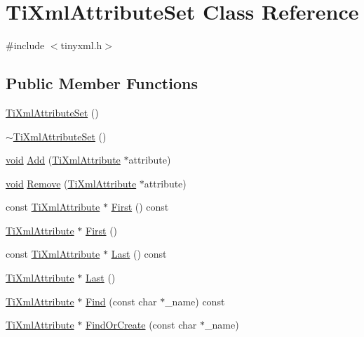 \hypertarget{class_ti_xml_attribute_set}{\section{Ti\-Xml\-Attribute\-Set Class Reference}
\label{class_ti_xml_attribute_set}
}


{\ttfamily \#include $<$tinyxml.\-h$>$}

\subsection*{Public Member Functions}
\begin{DoxyCompactItemize}
\item 
\hyperlink{class_ti_xml_attribute_set_a253c33b657cc85a07f7f060b02146c35}{Ti\-Xml\-Attribute\-Set} ()
\item 
\hyperlink{class_ti_xml_attribute_set_add463905dff96142a29fe16a01ecf28f}{$\sim$\-Ti\-Xml\-Attribute\-Set} ()
\item 
\hyperlink{wglew_8h_aeea6e3dfae3acf232096f57d2d57f084}{void} \hyperlink{class_ti_xml_attribute_set_a745e50ddaae3bee93e4589321e0b9c1a}{Add} (\hyperlink{class_ti_xml_attribute}{Ti\-Xml\-Attribute} $\ast$attribute)
\item 
\hyperlink{wglew_8h_aeea6e3dfae3acf232096f57d2d57f084}{void} \hyperlink{class_ti_xml_attribute_set_a924a73d071f2573f9060f0be57879c57}{Remove} (\hyperlink{class_ti_xml_attribute}{Ti\-Xml\-Attribute} $\ast$attribute)
\item 
const \hyperlink{class_ti_xml_attribute}{Ti\-Xml\-Attribute} $\ast$ \hyperlink{class_ti_xml_attribute_set_ae0636e88cedd4b09d61c451860f68598}{First} () const 
\item 
\hyperlink{class_ti_xml_attribute}{Ti\-Xml\-Attribute} $\ast$ \hyperlink{class_ti_xml_attribute_set_a99703bb08ca2aece2d7ef835de339ba0}{First} ()
\item 
const \hyperlink{class_ti_xml_attribute}{Ti\-Xml\-Attribute} $\ast$ \hyperlink{class_ti_xml_attribute_set_a7b3f3ccf39a97bc25539d3fcc540296a}{Last} () const 
\item 
\hyperlink{class_ti_xml_attribute}{Ti\-Xml\-Attribute} $\ast$ \hyperlink{class_ti_xml_attribute_set_ab4c4edfb2d74f6ea31aae096743bd6e0}{Last} ()
\item 
\hyperlink{class_ti_xml_attribute}{Ti\-Xml\-Attribute} $\ast$ \hyperlink{class_ti_xml_attribute_set_a941aca775190f097b7eefb9e9f078a83}{Find} (const char $\ast$\-\_\-name) const 
\item 
\hyperlink{class_ti_xml_attribute}{Ti\-Xml\-Attribute} $\ast$ \hyperlink{class_ti_xml_attribute_set_adb975daec84e6d8a5ff93a85381e6e26}{Find\-Or\-Create} (const char $\ast$\-\_\-name)
\end{DoxyCompactItemize}


